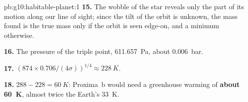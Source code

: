 \begin{solution}{pb:g10:habitable-planet:1}
\textbf{15.} The wobble of the star reveals only the part of its motion along
our line of sight; since the tilt of the orbit is unknown, the mass found is
the true mass only if the orbit is seen edge-on, and a minimum otherwise.

\textbf{16.} The pressure of the triple point, \qty{611.657}{Pa}, about
\qty{0.006}{bar}.

\textbf{17.} $(874 \times 0.706/(4\sigma))^{1/4} \approx \qty{228}{K}$.

\textbf{18.} $288 - 228 = \qty{60}{K}$: Proxima~b would need a greenhouse
warming of \textbf{about \qty{60}{K}}, almost twice the Earth's \qty{33}{K}.
\end{solution}
